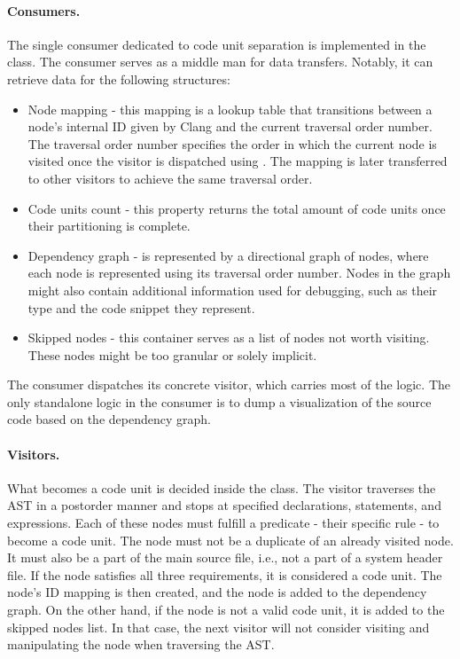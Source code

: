 \paragraph{Consumers.} The single consumer dedicated to code unit separation 
is implemented in the  class. 
The consumer serves as a middle man for data transfers. 
Notably, it can retrieve data for the following structures:
\begin{itemize}
  \item Node mapping - this mapping is a lookup table that transitions 
  between a node's internal ID given by Clang and the current traversal 
  order number. 
  The traversal order number specifies the order in which the current node 
  is visited once the visitor is dispatched using 
  . 
  The mapping is later transferred to other visitors to achieve the same 
  traversal order.
  \item Code units count - this property returns the total amount of code 
  units once their partitioning is complete.
  \item Dependency graph - is represented by a directional graph of nodes, 
  where each node is represented using its traversal order number. 
  Nodes in the graph might also contain additional information used for 
  debugging, such as their type and the code snippet they represent.
  \item Skipped nodes - this container serves as a list of nodes not worth 
  visiting. 
  These nodes might be too granular or solely implicit.
\end{itemize}
The consumer dispatches its concrete visitor, which carries most of 
the logic. 
The only standalone logic in the consumer is to dump a visualization of 
the source code based on the dependency graph.

\paragraph{Visitors.} What becomes a code unit is decided inside 
the  class. 
The visitor traverses the AST in a postorder manner and stops at specified 
declarations, statements, and expressions. 
Each of these nodes must fulfill a predicate - their specific rule - to 
become a code unit. 
The node must not be a duplicate of an already visited node. 
It must also be a part of the main source file, i.e., not a part of a system 
header file. 
If the node satisfies all three requirements, it is considered a code unit. 
The node's ID mapping is then created, and the node is added to 
the dependency graph. 
On the other hand, if the node is not a valid code unit, it is added to 
the skipped nodes list. 
In that case, the next visitor will not consider visiting and manipulating 
the node when traversing the AST.

